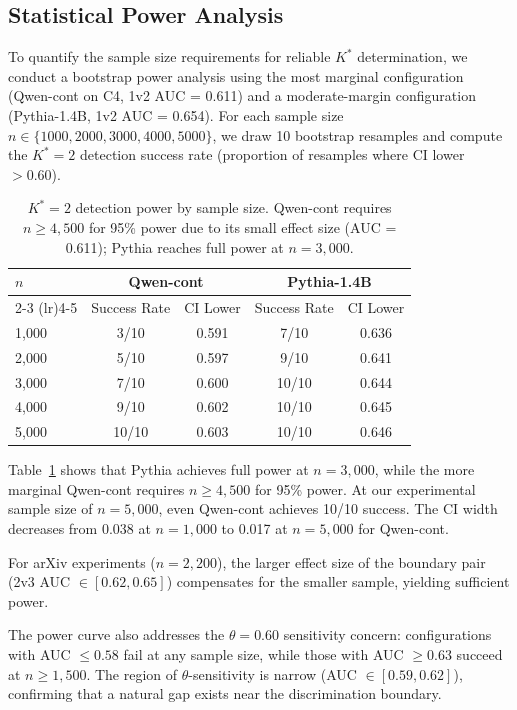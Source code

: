 \documentclass[11pt]{article}
\begin{document}
\subsection{Statistical Power Analysis}
\label{sec:power}

To quantify the sample size requirements for reliable $K^*$ determination, we conduct a bootstrap power analysis using the most marginal configuration (Qwen-cont on C4, 1v2 AUC = 0.611) and a moderate-margin configuration (Pythia-1.4B, 1v2 AUC = 0.654). For each sample size $n \in \{1000, 2000, 3000, 4000, 5000\}$, we draw 10 bootstrap resamples and compute the $K^*{=}2$ detection success rate (proportion of resamples where CI lower $> 0.60$).

\begin{table}[t]
\centering
\caption{$K^*{=}2$ detection power by sample size. Qwen-cont requires $n \ge 4{,}500$ for 95\% power due to its small effect size (AUC = 0.611); Pythia reaches full power at $n = 3{,}000$.}
\label{tab:power-curve}
\small
\begin{tabular}{lcccc}
\toprule
$n$ & \multicolumn{2}{c}{Qwen-cont} & \multicolumn{2}{c}{Pythia-1.4B} \\
\cmidrule(lr){2-3} \cmidrule(lr){4-5}
& Success Rate & CI Lower & Success Rate & CI Lower \\
\midrule
1,000 & 3/10 & 0.591 & 7/10 & 0.636 \\
2,000 & 5/10 & 0.597 & 9/10 & 0.641 \\
3,000 & 7/10 & 0.600 & 10/10 & 0.644 \\
4,000 & 9/10 & 0.602 & 10/10 & 0.645 \\
5,000 & 10/10 & 0.603 & 10/10 & 0.646 \\
\bottomrule
\end{tabular}
\end{table}

Table~\ref{tab:power-curve} shows that Pythia achieves full power at $n = 3{,}000$, while the more marginal Qwen-cont requires $n \ge 4{,}500$ for 95\% power. At our experimental sample size of $n = 5{,}000$, even Qwen-cont achieves 10/10 success. The CI width decreases from 0.038 at $n{=}1{,}000$ to 0.017 at $n{=}5{,}000$ for Qwen-cont.

For arXiv experiments ($n = 2{,}200$), the larger effect size of the boundary pair (2v3 AUC $\in [0.62, 0.65]$) compensates for the smaller sample, yielding sufficient power.

The power curve also addresses the $\theta = 0.60$ sensitivity concern: configurations with AUC $\le 0.58$ fail at any sample size, while those with AUC $\ge 0.63$ succeed at $n \ge 1{,}500$. The region of $\theta$-sensitivity is narrow (AUC $\in [0.59, 0.62]$), confirming that a natural gap exists near the discrimination boundary.
\end{document}
